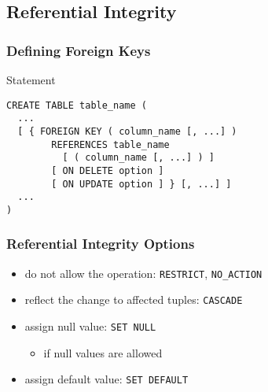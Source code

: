 \documentclass[dvipsnames]{beamer}
\theoremstyle{plain}
\begin{document}
\subsection{Referential Integrity}

\begin{frame}[fragile]
  \frametitle{Defining Foreign Keys}

  \begin{block}{Statement}
    \begin{lstlisting}
CREATE TABLE table_name (
  ...
  [ { FOREIGN KEY ( column_name [, ...] )
        REFERENCES table_name
          [ ( column_name [, ...] ) ]
        [ ON DELETE option ]
        [ ON UPDATE option ] } [, ...] ]
  ...
)
    \end{lstlisting}
  \end{block}
\end{frame}

\begin{frame}
  \frametitle{Referential Integrity Options}

  \begin{itemize}
    \item do not allow the operation: \texttt{RESTRICT}, \texttt{NO\_ACTION}

    \pause
    \item reflect the change to affected tuples: \texttt{CASCADE}

    \pause
    \item assign null value: \texttt{SET NULL}
    \begin{itemize}
      \item if null values are allowed
    \end{itemize}

    \pause
    \item assign default value: \texttt{SET DEFAULT}
  \end{itemize}
\end{frame}
\end{document}
